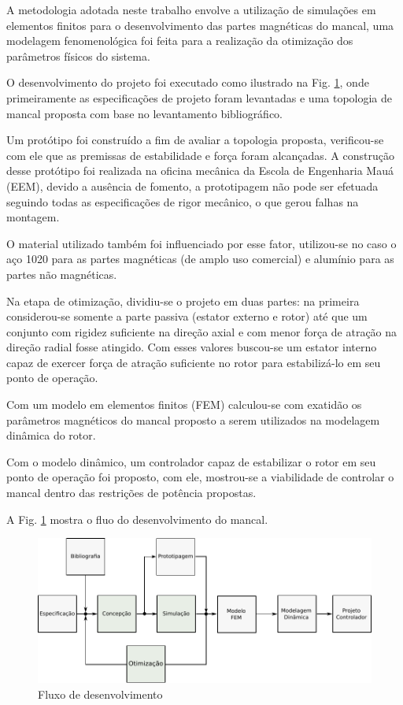 A metodologia adotada neste trabalho envolve a utilização de simulações em elementos finitos para o desenvolvimento das partes magnéticas do mancal, uma modelagem fenomenológica foi feita para a realização da otimização dos parâmetros físicos do sistema. 

O desenvolvimento do projeto foi executado como ilustrado na Fig. \ref{fig:metodologia:fluxo:dev}, onde primeiramente as especificações de projeto foram levantadas e uma topologia de mancal proposta com base no levantamento bibliográfico. 

Um protótipo foi construído a fim de avaliar a topologia proposta, verificou-se com ele que as premissas de estabilidade e força foram alcançadas. A construção desse protótipo foi realizada na oficina mecânica da Escola de Engenharia Mauá (EEM), devido a ausência de fomento, a prototipagem não pode ser efetuada seguindo todas as especificações de rigor mecânico, o que gerou falhas na montagem.

O material utilizado também foi influenciado por esse fator, utilizou-se no caso o aço 1020 para as partes magnéticas (de amplo uso comercial) e alumínio para as partes não magnéticas. 

Na etapa de otimização, dividiu-se o projeto em duas partes: na primeira considerou-se somente a parte passiva (estator externo e rotor) até que um conjunto com rigidez suficiente na direção axial e com menor força de atração na direção radial fosse atingido. Com esses valores buscou-se um estator interno capaz de exercer força de atração suficiente no rotor para estabilizá-lo em seu ponto de operação.

Com um modelo em elementos finitos (FEM) calculou-se com exatidão os parâmetros magnéticos do mancal proposto a serem utilizados na modelagem dinâmica do rotor.

Com o modelo dinâmico, um controlador capaz de estabilizar o rotor em seu ponto de operação foi proposto, com ele, mostrou-se a viabilidade de controlar o mancal dentro das restrições de potência propostas. 

A Fig. \ref{fig:metodologia:fluxo:dev} mostra o fluo do desenvolvimento do mancal.

 
\begin{figure}[th!]
	\centering
	\includegraphics[width=1\linewidth]{Figs/metodologia_fluxo_dev}
	\caption{Fluxo de desenvolvimento}
	\label{fig:metodologia:fluxo:dev}
\end{figure} 
 
